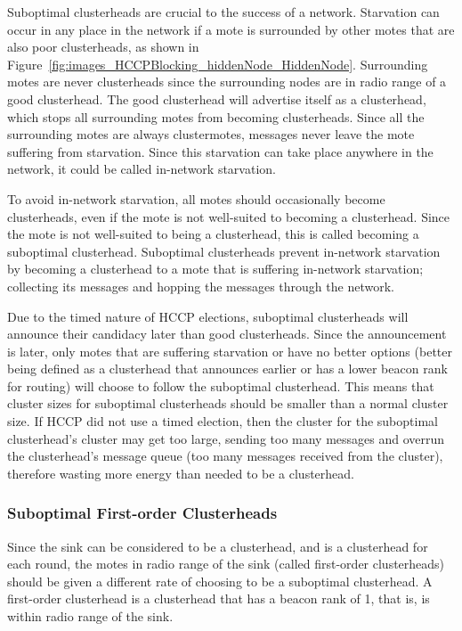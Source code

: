 Suboptimal clusterheads are crucial to the success of a network. Starvation can occur in any 
place in the network if a mote is surrounded by other motes that are also poor clusterheads, 
as shown in Figure~\ref{fig:images_HCCPBlocking_hiddenNode_HiddenNode}. Surrounding motes are 
never clusterheads since the surrounding nodes are in radio range of a good clusterhead. The
good clusterhead will advertise itself as a clusterhead, which stops all surrounding motes 
from becoming clusterheads. Since all the surrounding motes are always clustermotes, messages never leave
the mote suffering from starvation. Since this starvation can take place anywhere in the network, it could
be called in-network starvation.

To avoid in-network starvation, all motes should occasionally become clusterheads, even if 
the mote is not well-suited to becoming a clusterhead. Since the mote is not well-suited to being
a clusterhead, this is called becoming a suboptimal clusterhead. Suboptimal clusterheads prevent
in-network starvation by becoming a clusterhead to a mote that is suffering in-network starvation; collecting 
its messages and hopping the messages through the network. 

Due to the timed nature of HCCP elections, suboptimal clusterheads will announce their
candidacy later than good clusterheads. Since the announcement is later, only motes that are suffering
starvation or have no better options (better being defined as a clusterhead that announces earlier or has a lower beacon rank for routing) 
will choose to follow the suboptimal clusterhead. This means that cluster sizes for suboptimal clusterheads should 
be smaller than a normal cluster size. 
If HCCP did not use a timed election, then the cluster for the suboptimal clusterhead's cluster may get too large, sending
too many messages and overrun
the clusterhead's message queue (too many messages received from the cluster), therefore wasting more energy
than needed to 
be a clusterhead.



\subsubsection{Suboptimal First-order Clusterheads}

Since the sink can be considered to be a clusterhead, and is a clusterhead for each round, the motes in radio range of the sink
(called first-order clusterheads)
should be given a different rate of choosing to be a suboptimal clusterhead. A first-order clusterhead is a clusterhead 
that has a beacon rank of 1, that is, is within radio range of the sink.

